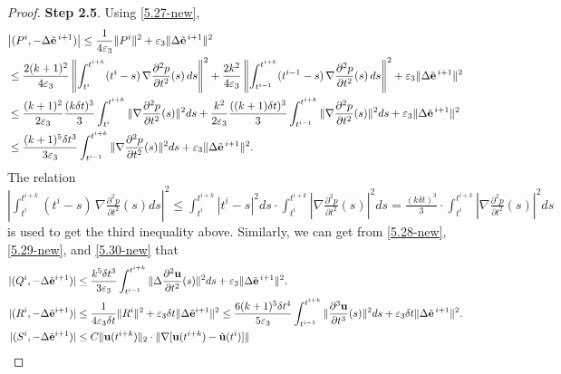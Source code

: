 \documentclass{article}
\theoremstyle{definition}                   %
\begin{document}
\begin{proof}
\vskip 0.2cm
{\bf Step 2.5}. 
Using \eqref{5.27-new}, 
\begin{align}
& \bigl| (P^i, -\Delta \tilde{\bf{e}}^{\,i+1}) \bigr|
\le \frac{1}{4\varepsilon_3} \|P^i\|^2
   + \varepsilon_3 \|\Delta \tilde{\bf{e}}^{\,i+1}\|^2
\notag\\
&\le \frac{2 (k+1)^2}{4\varepsilon_3}
\left\|
\int_{t^i}^{t^{i+k}} (t^i - s)\,
\nabla \frac{\partial^2 p}{\partial t^2}(s)\, ds
\right\|^2 
+ \frac{2 k^2}{4\varepsilon_3}
\left\|
\int_{t^{i-1}}^{t^{i+k}} (t^{i-1} - s)\,
\nabla \frac{\partial^2 p}{\partial t^2}(s)\, ds
\right\|^2 
+ \varepsilon_3 \|\Delta \tilde{\bf{e}}^{\,i+1}\|^2
\notag\\
&\le \frac{(k+1)^2}{2\varepsilon_3}
\frac{(k\delta t)^3}{3} 
\int_{t^i}^{t^{i+k}}
\| \nabla \frac{\partial^2 p}{\partial t^2}(s)\|^2 ds
+ \frac{k^2}{2\varepsilon_3}
\frac{((k+1)\delta t)^3}{3}
\int_{t^{i-1}}^{t^{i+k}} 
\| \nabla \frac{\partial^2 p}{\partial t^2}(s)\|^2 ds
+ \varepsilon_3 \|\Delta \tilde{\bf{e}}^{\,i+1}\|^2
\notag\\
&\le \frac{(k+1)^5 \delta t^3}{3\varepsilon_3} 
\int_{t^{i-1}}^{t^{i+k}} 
\| \nabla \frac{\partial^2 p}{\partial t^2}(s)\|^2 ds
+ \varepsilon_3 \|\Delta \tilde{\bf{e}}^{\,i+1}\|^2.
\label{5.44-new}
\end{align}
The relation  
$| \int_{t^i}^{t^{i+k}} (t^i - s)\,
\nabla \frac{\partial^2 p}{\partial t^2}(s)ds|^2
\le \int_{t^i}^{t^{i+k}} |t^i - s|^2 ds
\cdot\int_{t^i}^{t^{i+k}} 
|\nabla \frac{\partial^2 p}{\partial t^2}(s)|^2ds
=\frac{(k\delta t)^3}{3}\cdot \int_{t^i}^{t^{i+k}} 
|\nabla \frac{\partial^2 p}{\partial t^2}(s)|^2ds
$ is used to get the third inequality above. 
Similarly, we can get from \eqref{5.28-new}, \eqref{5.29-new}, and \eqref{5.30-new} that 
\begin{align}
|(Q^i, -\Delta \tilde{\bf e}^{i+1})|
&\le \frac{k^5 \delta t^3 }{3\varepsilon_3} 
\int_{t^{i-1}}^{t^{i+k}} 
\| \Delta \frac{\partial^2 {\bf u}}{\partial t^2}(s)\|^2 ds
+ \varepsilon_3 \|\Delta \tilde{\bf{e}}^{\,i+1}\|^2.
\label{5.45-new}
\\
|(R^i, -\Delta \tilde{\bf e}^{i+1})|
&\le \frac{1}{4\varepsilon_3 \delta t} \|R^i\|^2
+ \varepsilon_3\delta t \|\Delta \tilde{\bf e}^{i+1} \|^2
\le 
\frac{6 (k+1)^5 \delta t^4 }{5\varepsilon_3} 
\int_{t^{i-1}}^{t^{i+k}} 
\| \frac{\partial^3 {\bf u}}{\partial t^3}(s)\|^2 ds
+ \varepsilon_3 \delta t\|\Delta \tilde{\bf{e}}^{\,i+1}\|^2.
\label{5.46-new}
\\
|(S^i, -\Delta \tilde{\bf e}^{i+1})|
&\le 
C \|{\bf u}(t^{i+k})\|_2 \cdot 
\| \nabla[ {\bf u}(t^{i+k}) - \hat{\bf{u}}(t^i)] \|

\end{align}
\end{proof}
\end{document}
